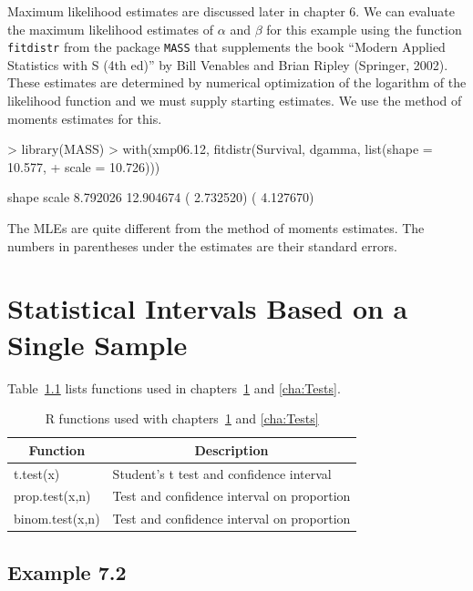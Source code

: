 \documentclass{book}
\begin{document}
Maximum likelihood estimates are discussed later in chapter 6.
We can evaluate the maximum likelihood estimates of $\alpha$ and
$\beta$ for this example using the function \texttt{fitdistr} from the
package \texttt{MASS} that supplements the book ``Modern Applied
Statistics with S (4th ed)'' by Bill Venables and Brian Ripley
(Springer, 2002).  These estimates are determined by numerical
optimization of the logarithm of the likelihood function and we must
supply starting estimates.  We use the method of moments estimates for
this.
\begin{Schunk}
\begin{Sinput}
> library(MASS)
> with(xmp06.12, fitdistr(Survival, dgamma, list(shape = 10.577, 
+     scale = 10.726)))
\end{Sinput}
\begin{Soutput}
     shape       scale  
   8.792026   12.904674 
 ( 2.732520) ( 4.127670)
\end{Soutput}
\end{Schunk}
The MLEs are quite different from the method of moments estimates.
The numbers in parentheses under the estimates are their standard errors.


\chapter[Statistical Intervals]{Statistical Intervals Based on a Single Sample}
\label{cha:Intervals}

Table~\ref{tab:ch7} lists functions used in
chapters~\ref{cha:Intervals} and \ref{cha:Tests}.
\begin{table}[htbp]
  \centering
  \begin{tabular}{l l}
    \multicolumn{1}{c}{\textbf{Function}} &
    \multicolumn{1}{c}{\textbf{Description}} \\\hline
    t.test(x)        & Student's t test and confidence interval\\
    prop.test(x,n)   & Test and confidence interval on proportion\\
    binom.test(x,n)  & Test and confidence interval on proportion\\
    \hline
  \end{tabular}
  \caption{R functions used with chapters~\ref{cha:Intervals} and
    \ref{cha:Tests}}
  \label{tab:ch7}
\end{table}

\section{Example 7.2}
\label{sec:xmp07.02}
\end{document}
